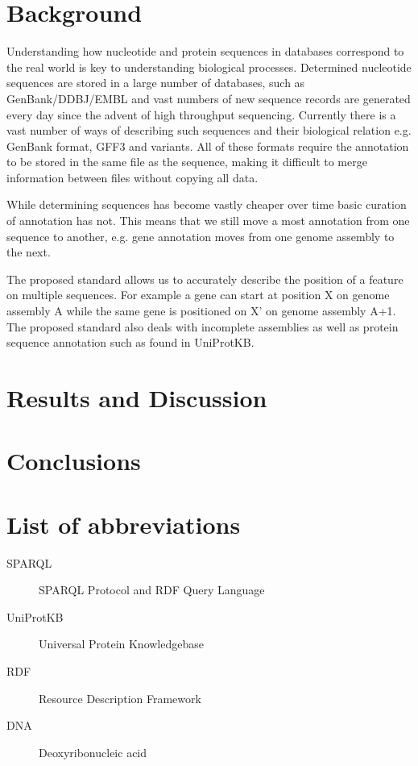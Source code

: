 \documentclass[10pt]{bmc_article}
\newenvironment{bmcformat}{\begin{raggedright}\baselineskip20pt\sloppy\setboolean{publ}{false}}{\end{raggedright}\baselineskip20pt\sloppy}
\begin{document}
\begin{bmcformat}
\section{Background}
Understanding how nucleotide and protein sequences in databases correspond to the real world is key to understanding biological processes.
Determined nucleotide sequences are stored in a large number of databases, such as GenBank/DDBJ/EMBL and vast numbers of new sequence records are generated every day since the advent of high throughput sequencing. Currently there is a vast number of ways of describing such sequences and their biological relation e.g. GenBank format, GFF3 and variants. All of these formats require the annotation to be stored in the same file as the sequence, making it difficult to merge information between files without copying all data.

While determining sequences has become vastly cheaper over time basic curation of annotation has not. This means that we still move a most annotation from one sequence to another, e.g. gene annotation moves from one genome assembly to the next.

The proposed standard allows us to accurately describe the position of a feature on multiple sequences. For example a gene can start at position X on genome assembly A while the same gene is positioned on X' on genome assembly A+1. The proposed standard also deals with incomplete assemblies as well as protein sequence annotation such as found in UniProtKB.

\section{Results and Discussion}

\section{Conclusions}

\section{List of abbreviations}
\begin{description}
\item[SPARQL] SPARQL Protocol and RDF Query Language
\item[UniProtKB] Universal Protein Knowledgebase 
\item[RDF] Resource Description Framework
\item[DNA] Deoxyribonucleic acid
\end{description}
\bigskip


\end{bmcformat}
\end{document}
